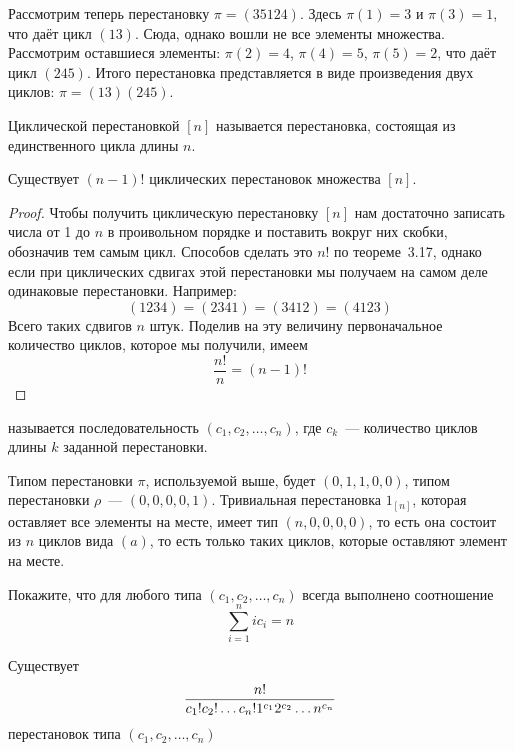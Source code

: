 Рассмотрим теперь перестановку $\pi = (35124)$. Здесь $\pi(1) = 3$ и $\pi(3) = 1$, что даёт цикл $(13)$. Сюда, однако вошли не все элементы множества. Рассмотрим оставшиеся элементы: $\pi(2) = 4$, $\pi(4) = 5$, $\pi(5) = 2$, что даёт цикл $(245)$. Итого перестановка представляется в виде произведения двух циклов: $\pi = (13)(245)$.

\begin{definition}
Циклической перестановкой $[n]$ называется перестановка, состоящая из единственного цикла длины $n$.
\end{definition}

\begin{thm}
Существует $(n-1)!$ циклических перестановок множества $[n]$.
\end{thm}
\begin{proof}
Чтобы получить циклическую перестановку $[n]$ нам достаточно записать числа от 1 до $n$ в проивольном порядке и поставить вокруг них скобки, обозначив тем самым цикл. Способов сделать это $n!$ по теореме~3.17, однако если при циклических сдвигах этой перестановки мы получаем на самом деле одинаковые перестановки. Например: $$(1234) = (2341) = (3412) = (4123)$$
Всего таких сдвигов $n$ штук. Поделив на эту величину первоначальное количество циклов, которое мы получили, имеем
$$\frac{n!}{n} = (n-1)!$$
\end{proof}

\begin{definition}
 называется последовательность $(c_1, c_2, \ldots, c_n)$, где $c_k$~--- количество циклов длины $k$ заданной перестановки.
\end{definition}

\begin{example}
Типом перестановки $\pi$, используемой выше, будет $(0, 1, 1, 0, 0)$, типом перестановки $\rho$~--- $(0, 0, 0, 0, 1)$. Тривиальная перестановка $1_{[n]}$, которая оставляет все элементы на месте, имеет тип $(n, 0, 0, 0, 0)$, то есть она состоит из $n$ циклов вида $(a)$, то есть только таких циклов, которые оставляют элемент на месте.
\end{example}

\begin{exercise}
Покажите, что для любого типа $(c_1, c_2, \ldots, c_n)$ всегда выполнено соотношение
$$\sum_{i=1}^n ic_i = n$$
\end{exercise}

\begin{thm}
Существует
$${n!\over c_1!c_2!\ldots c_n!1^{c_1}2^{c_2}\ldots n^{c_n}}$$
перестановок типа $(c_1, c_2, \ldots, c_n)$
\end{thm}
